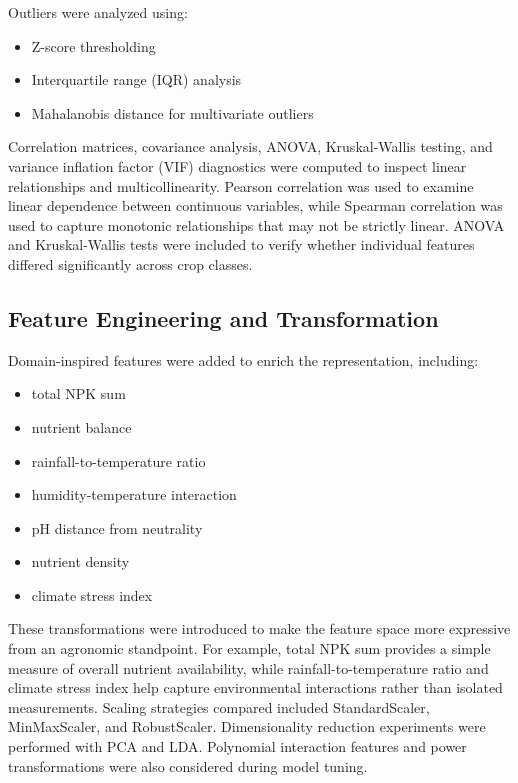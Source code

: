 \documentclass[conference]{IEEEtran}
\begin{document}
Outliers were analyzed using:
\begin{itemize}
    \item Z-score thresholding
    \item Interquartile range (IQR) analysis
    \item Mahalanobis distance for multivariate outliers
\end{itemize}

Correlation matrices, covariance analysis, ANOVA, Kruskal-Wallis testing, and variance inflation factor (VIF) diagnostics were computed to inspect linear relationships and multicollinearity. Pearson correlation was used to examine linear dependence between continuous variables, while Spearman correlation was used to capture monotonic relationships that may not be strictly linear. ANOVA and Kruskal-Wallis tests were included to verify whether individual features differed significantly across crop classes.

\subsection{Feature Engineering and Transformation}
Domain-inspired features were added to enrich the representation, including:
\begin{itemize}
    \item total NPK sum
    \item nutrient balance
    \item rainfall-to-temperature ratio
    \item humidity-temperature interaction
    \item pH distance from neutrality
    \item nutrient density
    \item climate stress index
\end{itemize}

These transformations were introduced to make the feature space more expressive from an agronomic standpoint. For example, total NPK sum provides a simple measure of overall nutrient availability, while rainfall-to-temperature ratio and climate stress index help capture environmental interactions rather than isolated measurements. Scaling strategies compared included StandardScaler, MinMaxScaler, and RobustScaler. Dimensionality reduction experiments were performed with PCA and LDA. Polynomial interaction features and power transformations were also considered during model tuning.
\end{document}
